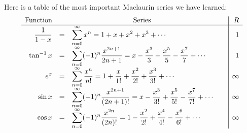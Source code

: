 \begin{frame}
Here is a table of the most important Maclaurin series we have learned:
\[
\begin{array}{rcl@{\qquad}|r}
\textrm{Function} & \multicolumn{2}{c|}{\textrm{Series}} & R \\
\hline
\displaystyle \frac{1}{1-x} & = & \displaystyle \sum_{n=0}^\infty x^n = 1 + x + x^2 + x^3 + \cdots  & 1\\
\displaystyle \tan^{-1} x & = & \displaystyle \sum_{n=0}^\infty (-1)^n \frac{x^{2n+1}}{2n+1} = x - \frac{x^3}{3} + \frac{x^5}{5} - \frac{x^7}{7} + \cdots  & 1\\
\displaystyle e^x & = & \displaystyle \sum_{n=0}^\infty \frac{x^n}{n!} = 1 + \frac{x}{1!} + \frac{x^2}{2!} + \frac{x^3}{3!} + \cdots  & \infty \\
\displaystyle \sin x & = & \displaystyle \sum_{n=0}^\infty (-1)^n \frac{x^{2n+1}}{(2n+1)!} = x - \frac{x^3}{3!} + \frac{x^5}{5!} - \frac{x^7}{7!} + \cdots  & \infty \\
\displaystyle \cos x & = & \displaystyle \sum_{n=0}^\infty (-1)^n \frac{x^{2n}}{(2n)!} = 1 - \frac{x^2}{2!} + \frac{x^4}{4!} - \frac{x^6}{6!} + \cdots  & \infty \\
\end{array}
\]
\end{frame}

